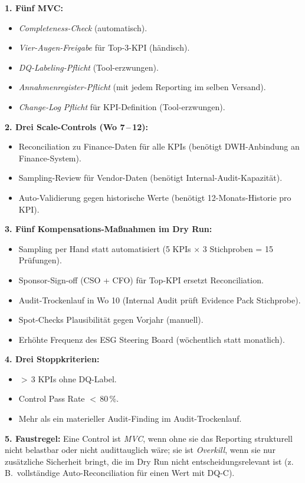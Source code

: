\documentclass[11pt,a4paper,oneside]{article}
\begin{document}
\begin{loesungbox}
\textbf{1. F\"unf MVC:}
\begin{itemize}
  \item \emph{Completeness-Check} (automatisch).
  \item \emph{Vier-Augen-Freigabe} f\"ur Top-3-KPI (h\"andisch).
  \item \emph{DQ-Labeling-Pflicht} (Tool-erzwungen).
  \item \emph{Annahmenregister-Pflicht} (mit jedem Reporting im selben Versand).
  \item \emph{Change-Log Pflicht} f\"ur KPI-Definition (Tool-erzwungen).
\end{itemize}

\smallskip
\textbf{2. Drei Scale-Controls (Wo 7\,--\,12):}
\begin{itemize}
  \item Reconciliation zu Finance-Daten f\"ur alle KPIs (ben\"otigt DWH-Anbindung an Finance-System).
  \item Sampling-Review f\"ur Vendor-Daten (ben\"otigt Internal-Audit-Kapazit\"at).
  \item Auto-Validierung gegen historische Werte (ben\"otigt 12-Monats-Historie pro KPI).
\end{itemize}

\smallskip
\textbf{3. F\"unf Kompensations-Ma{\ss}nahmen im Dry Run:}
\begin{itemize}
  \item Sampling per Hand statt automatisiert (5 KPIs $\times$ 3 Stichproben = 15 Pr\"ufungen).
  \item Sponsor-Sign-off (CSO + CFO) f\"ur Top-KPI ersetzt Reconciliation.
  \item Audit-Trockenlauf in Wo 10 (Internal Audit pr\"uft Evidence Pack Stichprobe).
  \item Spot-Checks Plausibilit\"at gegen Vorjahr (manuell).
  \item Erh\"ohte Frequenz des ESG Steering Board (w\"ochentlich statt monatlich).
\end{itemize}

\smallskip
\textbf{4. Drei Stoppkriterien:}
\begin{itemize}
  \item $>$\,3 KPIs ohne DQ-Label.
  \item Control Pass Rate $<$\,80\,\%.
  \item Mehr als ein materieller Audit-Finding im Audit-Trockenlauf.
\end{itemize}

\smallskip
\textbf{5. Faustregel:} Eine Control ist \emph{MVC}, wenn ohne sie das Reporting strukturell nicht belastbar oder nicht audittauglich w\"are; sie ist \emph{Overkill}, wenn sie nur zus\"atzliche Sicherheit bringt, die im Dry Run nicht entscheidungsrelevant ist (z.\,B.\ vollst\"andige Auto-Reconciliation f\"ur einen Wert mit DQ-C).
\end{loesungbox}
\end{document}
